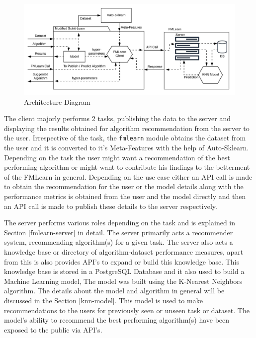\begin{figure}[t]
    \centering
    \includegraphics[width=15cm]{images/FML Architecture Diagram.jpeg}
    \caption{Architecture Diagram}
    \label{architecture-diagram}
\end{figure}

The client majorly performs 2 tasks, publishing the data to the server and displaying the results obtained for algorithm recommendation from the server to the user. Irrespective of the task, the \texttt{fmlearn} module obtains the dataset from the user and it is converted to it's Meta-Features with the help of Auto-Sklearn. Depending on the task the user might want a recommendation of the best performing algorithm or might want to contribute his findings to the betterment of the FMLearn in general. Depending on the use case either an API call is made to obtain the recommendation for the user or the model details along with the performance metrics is obtained from the user and the model directly and then an API call is made to publish these details to the server respectively.

The server performs various roles depending on the task and is explained in Section \ref{fmlearn-server} in detail. The server primarily acts a recommender system, recommending algorithm(s) for a given task. The server also acts a knowledge base or directory of algorithm-dataset performance measures, apart from this is also provides API's to expand or build this knowledge base. This knowledge base is stored in a PostgreSQL Database and it also used to build a Machine Learning model, The model was built using the K-Nearest Neighbors algorithm. The details about the model and algorithm in general will be discussed in the Section \ref{knn-model}. This model is used to make recommendations to the users for previously seen or unseen task or dataset. The model's ability to recommend the best performing algorithm(s) have been exposed to the public via API's.


